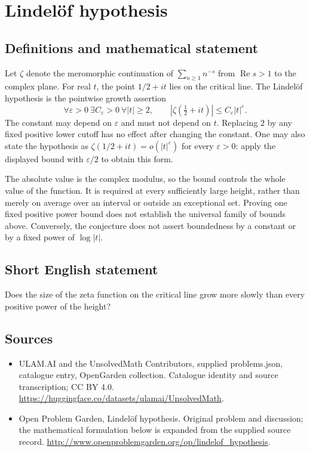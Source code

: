 \documentclass[11pt,a4paper]{article}
\begin{document}
\section*{Lindelöf hypothesis}\label{statement}

\subsection{Definitions and mathematical statement}
Let $\zeta$ denote the meromorphic continuation of
$\sum_{n\ge1}n^{-s}$ from $\operatorname{Re}s>1$ to the complex plane.
For real $t$, the point $1/2+it$ lies on the critical line. The
Lindel\"of hypothesis is the pointwise growth assertion
\[
 \forall\varepsilon>0\ \exists C_\varepsilon>0\ \forall |t|\ge2,
 \qquad |\zeta(\tfrac12+it)|\le C_\varepsilon |t|^\varepsilon.
\]
The constant may depend on $\varepsilon$ and must not depend on $t$.
Replacing $2$ by any fixed positive lower cutoff has no effect after
changing the constant. One may also state the hypothesis as
$\zeta(1/2+it)=o(|t|^\varepsilon)$ for every $\varepsilon>0$:
apply the displayed bound with $\varepsilon/2$ to obtain this form.

The absolute value is the complex modulus, so the bound controls the
whole value of the function. It is required at every sufficiently
large height, rather than merely on average over an interval or
outside an exceptional set. Proving one fixed positive power bound
does not establish the universal family of bounds above. Conversely,
the conjecture does not assert boundedness by a constant or by a
fixed power of $\log |t|$.
\subsection{Short English statement}
Does the size of the zeta function on the critical line grow more slowly than every positive power of the height?
\subsection{Sources}
\begin{itemize}
\item[S1] ULAM.AI and the UnsolvedMath Contributors, supplied problems.json, catalogue entry, OpenGarden collection. Catalogue identity and source transcription; CC BY 4.0.
\url{https://huggingface.co/datasets/ulamai/UnsolvedMath}.
\item[S2] Open Problem Garden, Lindelöf hypothesis. Original problem and discussion; the mathematical formulation below is expanded from the supplied source record.
\url{http://www.openproblemgarden.org/op/lindelof_hypothesis}.
\end{itemize}
\end{document}

